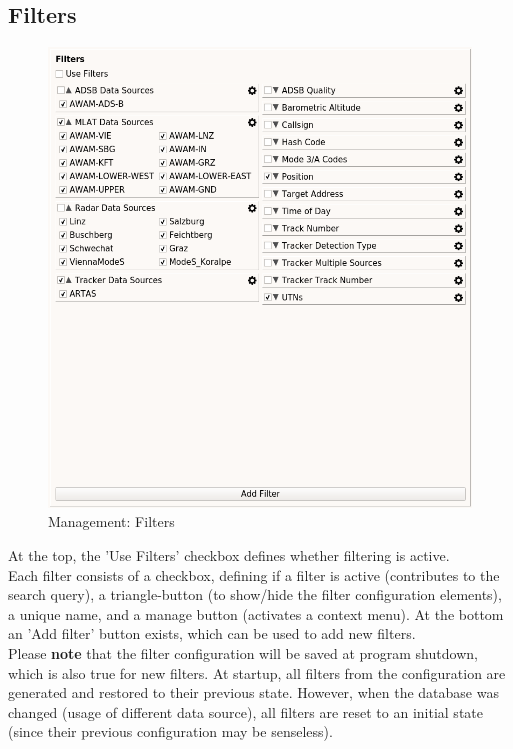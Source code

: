 \subsection{Filters}

\begin{figure}[H]
  \center
    \includegraphics[width=14cm,frame]{figures/load_filters.png}
  \caption{Management: Filters}
\end{figure}

At the top, the 'Use Filters' checkbox defines whether filtering is active. \\

Each filter consists of a checkbox, defining if a filter is active (contributes to the search query), a triangle-button (to show/hide the filter configuration elements), a unique name, and a manage button (activates a context menu). At the bottom an 'Add filter' button exists, which can be used to add new filters. \\

Please \textbf{note} that the filter configuration will be saved at program shutdown, which is also true for new filters.   At  startup,  all  filters  from  the  configuration  are  generated  and  restored  to  their  previous  state. However, when the database was changed (usage of different data source), all filters are reset to an initial
state (since their previous configuration may be senseless). \\

